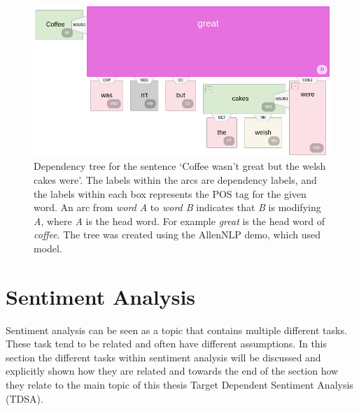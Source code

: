 \begin{figure}[!h]
    \centering
    \includegraphics[scale=0.28]{images/lit_review/dependency_parse_tree.png}
    \caption{Dependency tree for the sentence `Coffee wasn't great but the welsh cakes were'. The labels within the arcs are dependency labels, and the labels within each box represents the POS tag for the given word. An arc from \textit{word A} to \textit{word B} indicates that \textit{B} is modifying \textit{A}, where \textit{A} is the head word. For example \textit{great} is the head word of \textit{coffee}. The tree was created using the AllenNLP demo, which used \citet{DBLP:conf/iclr/DozatM17} model.}
    \label{fig:lit_review_dependency_parse_tree}
\end{figure}

\section{Sentiment Analysis}
Sentiment analysis can be seen as a topic that contains multiple different tasks. These task tend to be related and often have different assumptions. In this section the different tasks within sentiment analysis  will be discussed and explicitly shown how they are related and towards the end of the section how they relate to the main topic of this thesis Target Dependent Sentiment Analysis (TDSA).

